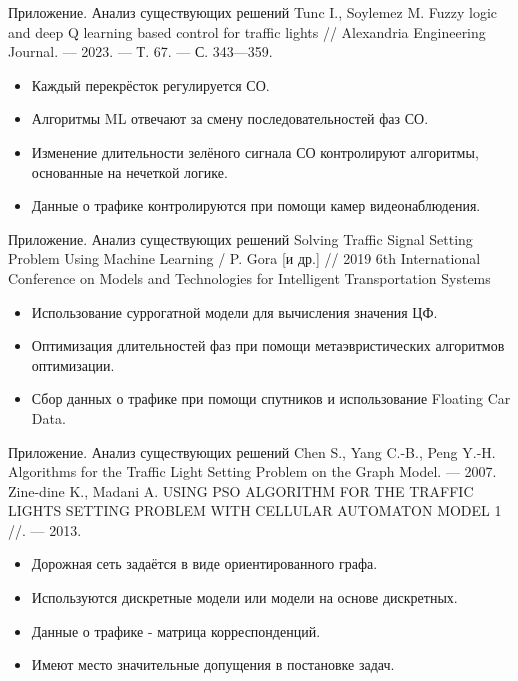 \documentclass[aspectratio=169]{beamer}
\begin{document}
	\begin{frame}{Приложение. Анализ существующих решений}
		Tunc I., Soylemez M. Fuzzy logic and deep Q learning based control for traffic lights // Alexandria Engineering Journal. — 2023. — Т. 67. — С. 343—359.
		\begin{itemize}
			\item Каждый перекрёсток регулируется СО.
			\item Алгоритмы ML отвечают за смену последовательностей фаз СО.
			\item Изменение длительности зелёного сигнала СО контролируют алгоритмы, основанные на нечеткой логике.
			\item Данные о трафике контролируются при помощи камер видеонаблюдения.
		\end{itemize}
	\end{frame}
	
	\begin{frame}{Приложение. Анализ существующих решений}
		Solving Traffic Signal Setting Problem Using Machine Learning / P. Gora
		[и др.] // 2019 6th International Conference on Models and Technologies for Intelligent
		Transportation Systems
		\begin{itemize}
			\item Использование суррогатной модели для вычисления значения ЦФ.
			\item Оптимизация длительностей фаз при помощи метаэвристических алгоритмов оптимизации.
			\item Сбор данных о трафике при помощи спутников и использование Floating Car Data.
		\end{itemize}
	\end{frame}
	
	\begin{frame}{Приложение. Анализ существующих решений}
		Chen S., Yang C.-B., Peng Y.-H. Algorithms for the Traffic Light Setting
		Problem on the Graph Model. — 2007.\\
		Zine-dine K., Madani A. USING PSO ALGORITHM FOR THE TRAFFIC
		LIGHTS SETTING PROBLEM WITH CELLULAR AUTOMATON MODEL 1 //. —
		2013.
		\begin{itemize}
			\item Дорожная сеть задаётся в виде ориентированного графа.
			\item Используются дискретные модели или модели на основе дискретных.
			\item Данные о трафике - матрица корреспонденций.
			\item Имеют место значительные допущения в постановке задач.
		\end{itemize}
	\end{frame}
	
\end{document}
